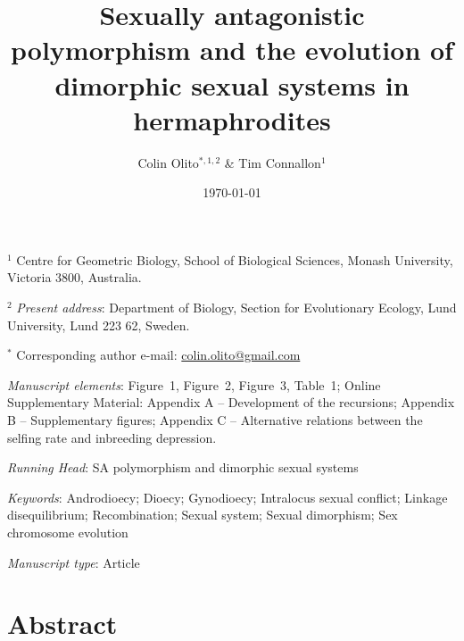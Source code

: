 \documentclass{article}
\title{Sexually antagonistic polymorphism and the evolution of dimorphic sexual systems in hermaphrodites}
\author{Colin Olito$^{\ast,1,2}$ \& Tim Connallon$^{1}$}
\date{\today}
\begin{document}
\maketitle


\noindent{} $^{1}$ Centre for Geometric Biology, School of Biological Sciences, Monash University, Victoria 3800, Australia.

\noindent{} $^{2}$ \textit{Present address}: Department of Biology, Section for Evolutionary Ecology, Lund University, Lund 223 62, Sweden.

\noindent{} $^{\ast}$ Corresponding author e-mail: \url{colin.olito@gmail.com}

\bigskip

\noindent{} \textit{Manuscript elements}: Figure~1, Figure~2, Figure~3, Table~1; Online Supplementary Material: Appendix A -- Development of the recursions; Appendix B -- Supplementary figures; Appendix C -- Alternative relations between the selfing rate and inbreeding depression.

\bigskip
\noindent{} \textit{Running Head}: SA polymorphism and dimorphic sexual systems

\bigskip

\noindent{} \textit{Keywords}: Androdioecy; Dioecy; Gynodioecy; Intralocus sexual conflict; Linkage disequilibrium; Recombination; Sexual system; Sexual dimorphism; Sex chromosome evolution

\bigskip

\noindent{} \textit{Manuscript type}: Article

\bigskip


\linenumbers
\modulolinenumbers[1]
\renewcommand\linenumberfont{\normalfont\small}


\newpage{}
\section*{Abstract}
\end{document}
